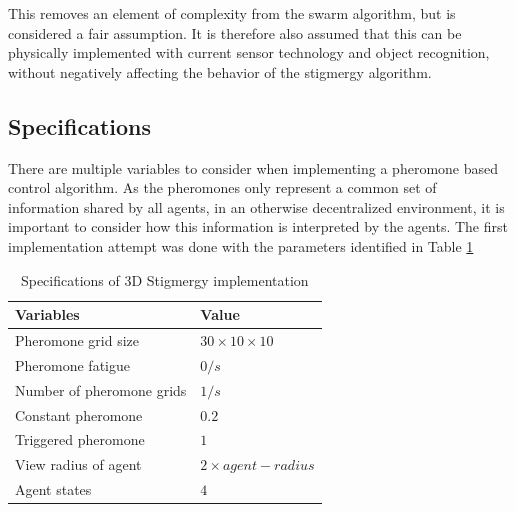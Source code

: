 This removes an element of complexity from the swarm algorithm, but is considered a fair assumption. It is therefore also assumed that this can be physically implemented with current sensor technology and object recognition, without negatively affecting the behavior of the stigmergy algorithm. 

\subsection{Specifications}
There are multiple variables to consider when implementing a pheromone based control algorithm. As the pheromones only represent a common set of information shared by all agents, in an otherwise decentralized environment, it is important to consider how this information is interpreted by the agents.  
The first implementation attempt was done with the parameters identified in Table \ref{tab:vars1}

\begin{table}[H]
\centering
\label{tab:vars1}
\begin{tabularx}{0.6\textwidth}{ll}
\toprule
\textbf{Variables}     & \textbf{Value}  \\ \hline
Pheromone grid size    & $30 \times 10 \times 10$ \\ \hline
Pheromone fatigue      & $0/s$               \\
Number of pheromone grids      & $1/s$               \\
Constant pheromone  & $0.2$             \\
Triggered pheromone & $1$               \\
View radius of agent   & $2 \times agent-radius$ \\
Agent states           & $4$               \\ \hline
\end{tabularx}
\caption{Specifications of 3D Stigmergy implementation}
\end{table}

